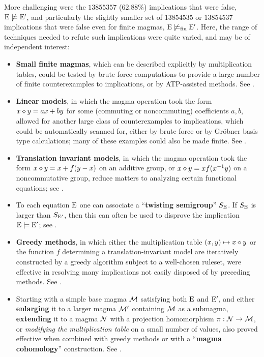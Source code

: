 More challenging were the $\num{13855357}$ ($62.88\%$) implications that were false, $\mathrm{E} \not\models {\mathrm{E}'}$, and particularly the slightly smaller set of $\num{13854535}$ or $\num{13854537}$ implications that were false even for finite magmas, $\mathrm{E} \not\models_{\mathrm{fin}} {\mathrm{E}'}$. Here, the range of techniques needed to refute such implications were quite varied, and may be of independent interest:
\begin{itemize}
        \item \textbf{Small finite magmas}, which can be described explicitly by multiplication tables, could be tested by brute force computations to provide a large number of finite counterexamples to implications, or by ATP-assisted methods. See .
        \item \textbf{Linear models}, in which the magma operation took the form $x \diamond y = ax + by$ for some (commuting or noncommuting) coefficients $a,b$, allowed for another large class of counterexamples to implications, which could be automatically scanned for, either by brute force or by Gr\"obner basis type calculations; many of these examples could also be made finite. See .
        \item \textbf{Translation invariant models}, in which the magma operation took the form $x \diamond y = x + f(y-x)$ on an additive group, or $x \diamond y = x f(x^{-1} y)$ on a noncommutative group, reduce matters to analyzing certain functional equations; see .
        \item To each equation $\mathrm{E}$ one can associate a ``\textbf{twisting semigroup}'' $S_{\mathrm{E}}$.  If $S_{\mathrm{E}}$ is larger than $S_{{\mathrm{E}'}}$, then this can often be used to disprove the implication ${\mathrm{E}} \models {\mathrm{E}'}$; see .
        \item \textbf{Greedy methods}, in which either the multiplication table $(x,y) \mapsto x \diamond y$ or the function $f$ determining a translation-invariant model are iteratively constructed by a greedy algorithm subject to a well-chosen ruleset, were effective in resolving many implications not easily disposed of by preceding methods. See .
        \item Starting with a simple base magma ${\mathcal{M}}$ satisfying both $\mathrm{E}$ and ${\mathrm{E}'}$, and either \textbf{enlarging} it to a larger magma ${\mathcal{M}}'$ containing ${\mathcal{M}}$ as a submagma, \textbf{extending} it to a magma ${\mathcal{N}}$ with a projection homomorphism $\pi: {\mathcal{N}} \to {\mathcal{M}}$, or \emph{modifying the multiplication table} on a small number of values, also proved effective when combined with greedy methods or with a ``\textbf{magma cohomology}'' construction. See .

\end{itemize}
